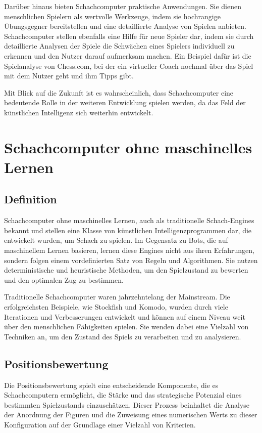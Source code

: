 Darüber hinaus bieten Schachcomputer praktische Anwendungen. Sie dienen menschlichen Spielern als wertvolle Werkzeuge, indem sie hochrangige Übungsgegner 
bereitstellen und eine detaillierte Analyse von Spielen anbieten. Schachcomputer stellen ebenfalls eine Hilfe für neue Spieler dar, indem sie durch
detaillierte Analysen der Spiele die Schwächen eines Spielers individuell zu erkennen und den Nutzer darauf aufmerksam machen. 
Ein Beispiel dafür ist die Spielanalyse von Chess.com, bei der ein virtueller Coach nochmal über das Spiel mit dem Nutzer geht und ihm Tipps gibt.

Mit Blick auf die Zukunft ist es wahrscheinlich, dass Schachcomputer eine bedeutende Rolle in der weiteren Entwicklung spielen werden, 
da das Feld der künstlichen Intelligenz sich weiterhin entwickelt.~\cite{Larry_Greenemeier_2017_scientificamerican}

\section{Schachcomputer ohne maschinelles Lernen}

\subsection{Definition}
Schachcomputer ohne maschinelles Lernen, auch als traditionelle Schach-Engines bekannt und stellen eine Klasse von künstlichen Intelligenzprogrammen dar, 
die entwickelt wurden, um Schach zu spielen. Im Gegensatz zu Bots, die auf maschinellem Lernen basieren, lernen diese Engines nicht aus ihren Erfahrungen, 
sondern folgen einem vordefinierten Satz von Regeln und Algorithmen.
Sie nutzen deterministische und heuristische Methoden, um den Spielzustand zu bewerten und den optimalen Zug zu bestimmen.

Traditionelle Schachcomputer waren jahrzehntelang der Mainstream. Die erfolgreichsten Beispiele, wie Stockfish und Komodo, 
wurden durch viele Iterationen und Verbesserungen entwickelt und können auf einem Niveau weit über den menschlichen Fähigkeiten spielen.
Sie wenden dabei eine Vielzahl von Techniken an, um den Zustand des Spiels zu verarbeiten und zu analysieren.

\subsection{Positionsbewertung}
Die Positionsbewertung spielt eine entscheidende Komponente, die es Schachcomputern ermöglicht, die Stärke und das strategische Potenzial eines bestimmten 
Spielzustands einzuschätzen. Dieser Prozess beinhaltet die Analyse der Anordnung der Figuren und die Zuweisung eines numerischen Werts zu dieser 
Konfiguration auf der Grundlage einer Vielzahl von Kriterien.

